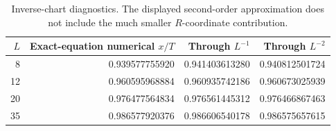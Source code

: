 \begin{table}[htbp]\centering\small
\begin{tabular}{rrrr}\toprule
$L$ & Exact-equation numerical $x/T$ & Through $L^{-1}$ & Through $L^{-2}$\\\midrule
8 & 0.939577755920 & 0.941403613280 & 0.940812501724 \\
12 & 0.960595968884 & 0.960935742186 & 0.960673025939 \\
20 & 0.976477564834 & 0.976561445312 & 0.976466867463 \\
35 & 0.986577920376 & 0.986606540178 & 0.986575657615 \\
\bottomrule\end{tabular}
\caption{Inverse-chart diagnostics. The displayed second-order approximation does not include the much smaller $R$-coordinate contribution.}\label{tab:inverse}
\end{table}
